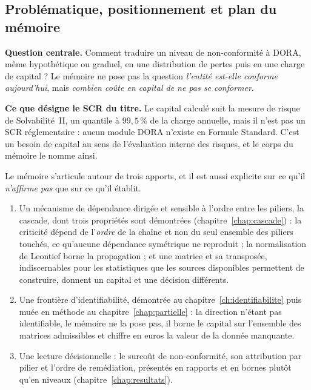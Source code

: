 \subsection{Problématique, positionnement et plan du mémoire}
\label{subsec:problematique-positionnement}

\begin{cle}
\textbf{Question centrale.} Comment traduire un niveau de non-conformité à DORA, même
hypothétique ou graduel, en une distribution de pertes puis en une charge de capital ? Le mémoire
ne pose pas la question \emph{l'entité est-elle conforme aujourd'hui}, mais \emph{combien coûte en
capital de ne pas se conformer}.

\textbf{Ce que désigne le SCR du titre.} Le capital calculé suit la mesure de risque de
Solvabilité~II, un quantile à $99{,}5\,\%$ de la charge annuelle, mais il n'est pas un SCR
réglementaire : aucun module DORA n'existe en Formule Standard. C'est un besoin de capital au
sens de l'évaluation interne des risques, et le corps du mémoire le nomme ainsi.
\end{cle}

Le mémoire s'articule autour de trois apports, et il est aussi explicite sur ce qu'il
\emph{n'affirme pas} que sur ce qu'il établit.

\begin{enumerate}[leftmargin=1.4em,itemsep=3pt]
\item Un mécanisme de dépendance dirigée et sensible à l'ordre entre les piliers, la cascade,
      dont trois propriétés sont démontrées (chapitre~\ref{chap:cascade}) : la criticité dépend
      de l'\emph{ordre} de la chaîne et non du seul ensemble des piliers touchés, ce qu'aucune
      dépendance symétrique ne reproduit ; la normalisation de Leontief borne la propagation ; et
      une matrice et sa transposée, indiscernables pour les statistiques que les sources
      disponibles permettent de construire, donnent un capital et une décision différents.
\item Une frontière d'identifiabilité, démontrée au chapitre~\ref{ch:identifiabilite} puis muée
      en méthode au chapitre~\ref{chap:partielle} : la direction n'étant pas identifiable, le
      mémoire ne la pose pas, il borne le capital sur l'ensemble des matrices admissibles et
      chiffre en euros la valeur de la donnée manquante.
\item Une lecture décisionnelle : le surcoût de non-conformité, son attribution par pilier et
      l'ordre de remédiation, présentés en rapports et en bornes plutôt qu'en niveaux
      (chapitre~\ref{chap:resultats}).
\end{enumerate}

